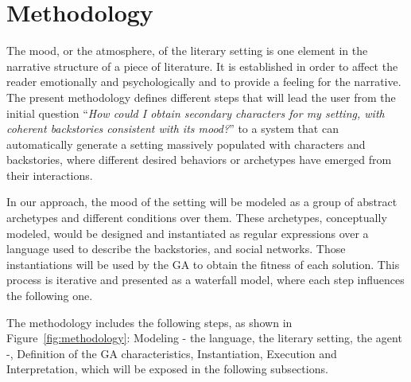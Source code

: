 \documentclass{sig-alternate}
\begin{document}

%
%

\section{Methodology}
\label{sec:methodology}

The mood, or the atmosphere, of the literary setting is one element in the narrative structure of a piece of literature. It is established in order to affect the reader emotionally and psychologically and to provide a feeling for the narrative.
\\

The present methodology defines different steps that will lead the user from the initial question ``\textit{How could I obtain secondary characters for my setting, with coherent backstories consistent with its mood?}'' to a system that can automatically generate a setting massively populated with characters and backstories, where different desired behaviors or archetypes have emerged from their interactions.

In our approach, the mood of the setting will be modeled as a group of abstract archetypes and different conditions over them. These archetypes, conceptually modeled, would be designed and instantiated as regular expressions over a language used to describe the backstories, and social networks. Those instantiations will be used by the GA to obtain the fitness of each solution. This process is iterative and presented as a waterfall model, where each step influences the following one.

The methodology includes the following steps, as shown in Figure~\ref{fig:methodology}: Modeling - the language, the literary setting, the agent -, Definition of the GA characteristics, Instantiation, Execution and Interpretation, which will be exposed in the following subsections.
\end{document}
